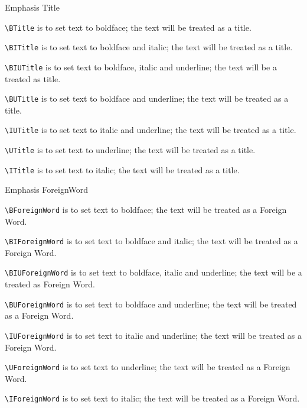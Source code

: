 \documentclass[12pt,Bold,letterpaper,TexShade]{mcgilletdclass}
\numberwithin{equation}{section}
\begin{document}
\begin{BulletList}
		\item{Emphasis Title}
		\begin{romanList}
			\item{ \verb=\BTitle= is to set text to boldface; the text will be treated as a title}.
			\item{ \verb=\BITitle= is to set text to boldface and italic; the text will be treated as a title}.
			\item{ \verb=\BIUTitle= is to set text to boldface, italic and underline; the text will be a treated as title}.
			\item{ \verb=\BUTitle= is to set text to boldface and underline; the text will be treated as a title}.
			\item{ \verb=\IUTitle= is to set text to italic and underline; the text will be treated as a title}.
			\item{ \verb=\UTitle= is to set text to underline; the text will be treated as a title}.
			\item{ \verb=\ITitle= is to set text to italic; the text will be treated as a title}.
		\end{romanList}

		\item{Emphasis ForeignWord}
		\begin{romanList}
			\item{ \verb=\BForeignWord= is to set text to boldface; the text will be treated as a Foreign Word}.
			\item{ \verb=\BIForeignWord= is to set text to boldface and italic; the text will be treated as a Foreign Word}.
			\item{ \verb=\BIUForeignWord= is to set text to boldface, italic and underline; the text will be a treated as Foreign Word}.
			\item{ \verb=\BUForeignWord= is to set text to boldface and underline; the text will be treated as a Foreign Word}.
			\item{ \verb=\IUForeignWord= is to set text to italic and underline; the text will be treated as a Foreign Word}.
			\item{ \verb=\UForeignWord= is to set text to underline; the text will be treated as a Foreign Word}.
			\item{ \verb=\IForeignWord= is to set text to italic; the text will be treated as a Foreign Word}.
		\end{romanList}


\end{BulletList}
\end{document}
